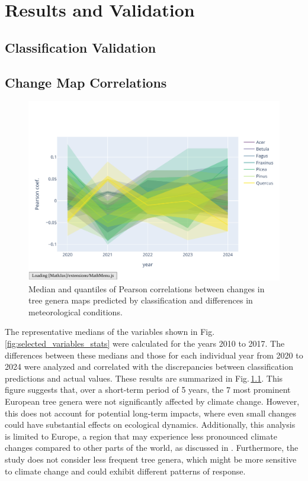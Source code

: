 \chapter{Results and Validation}
\label{chapter:results}

\section{Classification Validation}



\section{Change Map Correlations}

\begin{figure}[ht]
    \centering
    \includegraphics[width=0.98\linewidth, trim={10pt 20pt 10pt 40pt}, clip]{figures/figures_climate/genus_corr.pdf}
    \caption{Median and quantiles of Pearson correlations between changes in tree genera maps predicted by classification and differences in meteorological conditions.}
    \label{fig:genus_corr}
\end{figure}

The representative medians of the variables shown in Fig.\,\ref{fig:selected_variables_stats} were calculated for the years 2010 to 2017. The differences between these medians and those for each individual year from 2020 to 2024 were analyzed and correlated with the discrepancies between classification predictions and actual values. These results are summarized in Fig.\,\ref{fig:genus_corr}. This figure suggests that, over a short-term period of 5 years, the 7 most prominent European tree genera were not significantly affected by climate change. However, this does not account for potential long-term impacts, where even small changes could have substantial effects on ecological dynamics. Additionally, this analysis is limited to Europe, a region that may experience less pronounced climate changes compared to other parts of the world, as discussed in \cite{hoegh2018climate}. Furthermore, the study does not consider less frequent tree genera, which might be more sensitive to climate change and could exhibit different patterns of response.

